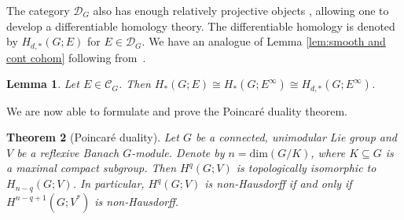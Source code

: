\documentclass[12pt,reqno]{amsart}
\newtheorem{theorem}{Theorem}[section]
\newtheorem{lemma}[theorem]{Lemma}
\theoremstyle{definition}
\begin{document}
The category $\mathcal{D}_G$ also has enough relatively projective objects \cite[Proposition~VI.4]{PichaudRegularization}, allowing one to develop a differentiable homology theory. The differentiable homology is denoted by $H_{d,*}(G;E)$ for $E \in \mathcal{D}_G$. We have an analogue of Lemma \ref{lem:smooth and cont cohom} following from~\cite[Propositions~VI.3, VI.4, VI.5]{PichaudRegularization}.
\begin{lemma}\label{lem:smooth and cont hom}
    Let $E \in \mathcal{C}_G$. Then $H_*(G;E)\cong H_*(G;E^\infty)\cong H_{d,*}(G;E^\infty)$.
\end{lemma}

We are now able to formulate and prove the Poincar\'e duality theorem.
\begin{theorem}[Poincaré duality]\label{thm:Poincare duality}
    Let $G$ be a connected, unimodular Lie group and $V$ be a reflexive Banach $G$-module. Denote by $n=\mathrm{dim}(G / K)$, where $K \subseteq G$ is a maximal compact subgroup. Then $H^q(G;V)$ is topologically isomorphic to $H_{n-q}(G;V)$. In particular, $H^q(G;V)$ is non-Hausdorff if and only if $H^{n-q+1}(G;V^*)$ is non-Hausdorff.
\end{theorem}
\end{document}
